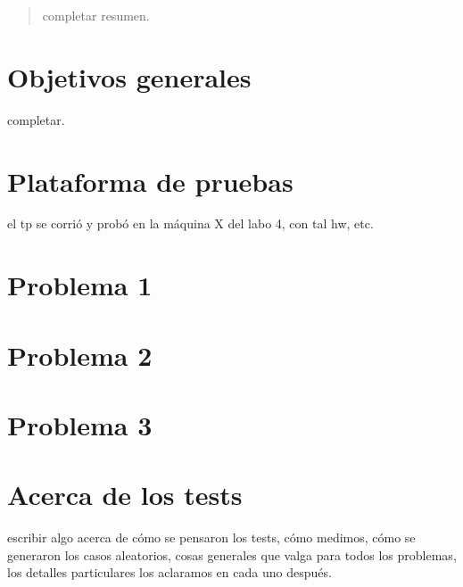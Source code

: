 \documentclass[a4paper]{article}
\begin{document}
\thispagestyle{empty}

\maketitle
\newpage

\thispagestyle{empty}
\vfill
\begin{abstract}
    completar resumen.
\end{abstract}

\thispagestyle{empty}
\vspace{3cm}
\tableofcontents
\newpage


\newpage

\section{Objetivos generales}
  completar.

\newpage

\section{Plataforma de pruebas}
    el tp se corrió y probó en la máquina X del labo 4, con tal hw, etc.

\newpage

\section{Problema 1}


\newpage

\section{Problema 2}


\newpage

\section{Problema 3}


\newpage
\section{Acerca de los tests}
    escribir algo acerca de cómo se pensaron los tests, cómo medimos, cómo se generaron los casos aleatorios, 
    cosas generales que valga para todos los problemas, los detalles particulares los aclaramos en cada uno después.
\end{document}
